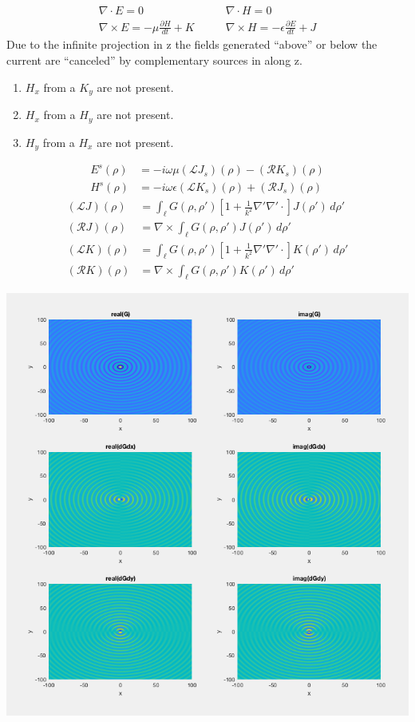 \documentclass{article}
\newcommand{\0}{\varnothing}
\begin{document}
\begin{minipage}{0.45\textwidth}
\begin{align*}
\nabla \cdot E = 0 \quad \quad
& \nabla \cdot H = 0 \\
\nabla \times E = -\mu \frac{\partial H}{dt} + K\quad \quad 
& \nabla \times H = -\epsilon \frac{\partial E}{dt} + J
\end{align*}
Due to the infinite projection in z the fields generated ``above'' or below the current are ``canceled'' by complementary sources in along z. 
    \begin{enumerate}
        \item $H_x$ from a $K_y$ are not present.
        \item $H_x$ from a $H_y$ are not present.
        \item $H_y$ from a $H_x$ are not present.
    \end{enumerate}
\begin{align*}
	E^s(\rho) &= -i\omega\mu(\mathcal{L}J_s)(\rho) - (\mathcal{R}K_s)(\rho)\\
	H^s(\rho) &= -i\omega\epsilon(\mathcal{L}K_s)(\rho) + (\mathcal{R}J_s)(\rho)
\end{align*}
\begin{align*}
	(\mathcal{L}J)(\rho) &= \int_{\ell}G(\rho,\rho')[1+\frac{1}{k^2}\nabla'\nabla'\cdotp]J(\rho') \,d\rho'\\
	(\mathcal{R}J)(\rho) &= \nabla \times \int_{\ell}G(\rho,\rho')J(\rho') \,d\rho'\\
	(\mathcal{L}K)(\rho) &= \int_{\ell}G(\rho,\rho')[1+\frac{1}{k^2}\nabla'\nabla'\cdotp]K(\rho') \,d\rho'\\
	(\mathcal{R}K)(\rho) &= \nabla \times \int_{\ell}G(\rho,\rho')K(\rho') \,d\rho'
\end{align*}
\end{minipage}
\begin{minipage}{0.55\textwidth}
\begin{center}
\includegraphics[width=0.75\columnwidth]{figures/GFct}
\end{center}
\end{minipage}
\end{document}
